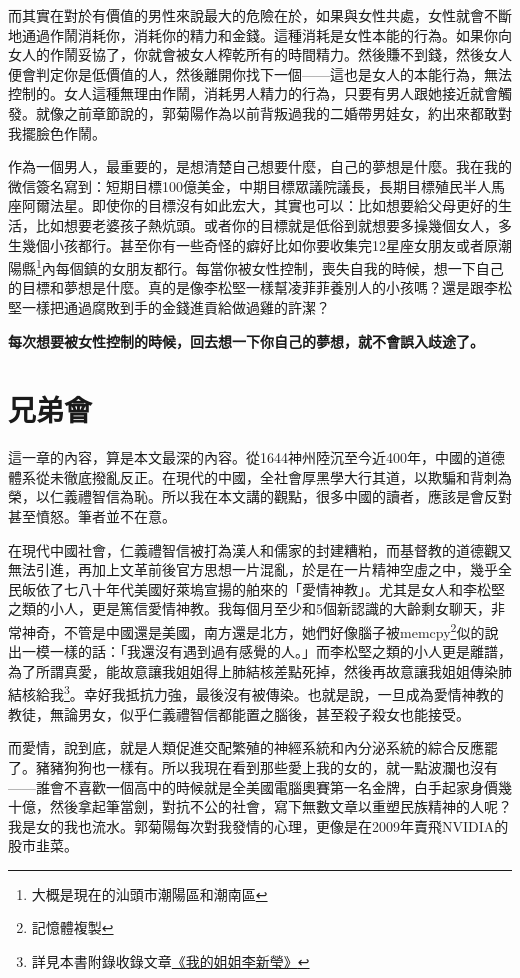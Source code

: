而其實在對於有價值的男性來說最大的危險在於，如果與女性共處，女性就會不斷地通過作鬧消耗你，消耗你的精力和金錢。這種消耗是女性本能的行為。如果你向女人的作鬧妥協了，你就會被女人榨乾所有的時間精力。然後賺不到錢，然後女人便會判定你是低價值的人，然後離開你找下一個——這也是女人的本能行為，無法控制的。女人這種無理由作鬧，消耗男人精力的行為，只要有男人跟她接近就會觸發。就像之前章節說的，郭菊陽作為以前背叛過我的二婚帶男娃女，約出來都敢對我擺臉色作鬧。

作為一個男人，最重要的，是想清楚自己想要什麼，自己的夢想是什麼。我在我的微信簽名寫到：短期目標100億美金，中期目標眾議院議長，長期目標殖民半人馬座阿爾法星。即使你的目標沒有如此宏大，其實也可以：比如想要給父母更好的生活，比如想要老婆孩子熱炕頭。或者你的目標就是低俗到就想要多操幾個女人，多生幾個小孩都行。甚至你有一些奇怪的癖好比如你要收集完12星座女朋友或者原潮陽縣\footnote{大概是現在的汕頭市潮陽區和潮南區}內每個鎮的女朋友都行。每當你被女性控制，喪失自我的時候，想一下自己的目標和夢想是什麼。真的是像李松堅一樣幫凌菲菲養別人的小孩嗎？還是跟李松堅一樣把通過腐敗到手的金錢進貢給做過雞的許潔？

\textbf{每次想要被女性控制的時候，回去想一下你自己的夢想，就不會誤入歧途了。}

\section{兄弟會}

這一章的內容，算是本文最深的內容。從1644神州陸沉至今近400年，中國的道德體系從未徹底撥亂反正。在現代的中國，全社會厚黑學大行其道，以欺騙和背刺為榮，以仁義禮智信為恥。所以我在本文講的觀點，很多中國的讀者，應該是會反對甚至憤怒。筆者並不在意。

在現代中國社會，仁義禮智信被打為漢人和儒家的封建糟粕，而基督教的道德觀又無法引進，再加上文革前後官方思想一片混亂，於是在一片精神空虛之中，幾乎全民皈依了七八十年代美國好萊塢宣揚的舶來的「愛情神教」。尤其是女人和李松堅之類的小人，更是篤信愛情神教。我每個月至少和5個新認識的大齡剩女聊天，非常神奇，不管是中國還是美國，南方還是北方，她們好像腦子被memcpy\footnote{記憶體複製}似的說出一模一樣的話：「我還沒有遇到過有感覺的人。」而李松堅之類的小人更是離譜，為了所謂真愛，能故意讓我姐姐得上肺結核差點死掉，然後再故意讓我姐姐傳染肺結核給我\footnote{詳見本書附錄收錄文章\hyperref[sister]{《我的姐姐李新瑩》}}。幸好我抵抗力強，最後沒有被傳染。也就是說，一旦成為愛情神教的教徒，無論男女，似乎仁義禮智信都能置之腦後，甚至殺子殺女也能接受。

而愛情，說到底，就是人類促進交配繁殖的神經系統和內分泌系統的綜合反應罷了。豬豬狗狗也一樣有。所以我現在看到那些愛上我的女的，就一點波瀾也沒有——誰會不喜歡一個高中的時候就是全美國電腦奧賽第一名金牌，白手起家身價幾十億，然後拿起筆當劍，對抗不公的社會，寫下無數文章以重塑民族精神的人呢？我是女的我也流水。郭菊陽每次對我發情的心理，更像是在2009年賣飛NVIDIA的股市韭菜。

